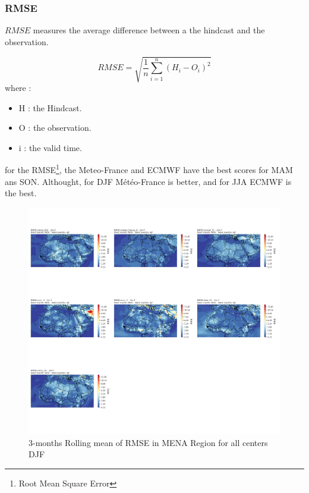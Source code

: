 \subsubsection{RMSE}
 
 $RMSE$ measures the average difference between a the hindcast and the observation.
 
$$RMSE=\sqrt{\frac{1}{n} \sum\limits_{i=1}^{n}(H_i -O_i)^2}$$
where :
\begin{itemize}
	\item H : the Hindcast.
	\item O : the observation.
	\item i : the valid time.
\end{itemize}

for the RMSE\footnote{Root Mean Square Error}, the Meteo-France and ECMWF have the best scores for MAM ans SON. Althought, for DJF Météo-France is better, and for JJA ECMWF is the best.

\begin{figure}[H]
\includegraphics[scale=0.3]{RMSE_DJF.png}
\caption{3-months Rolling mean of RMSE in MENA Region for all centers DJF}
\end{figure}

